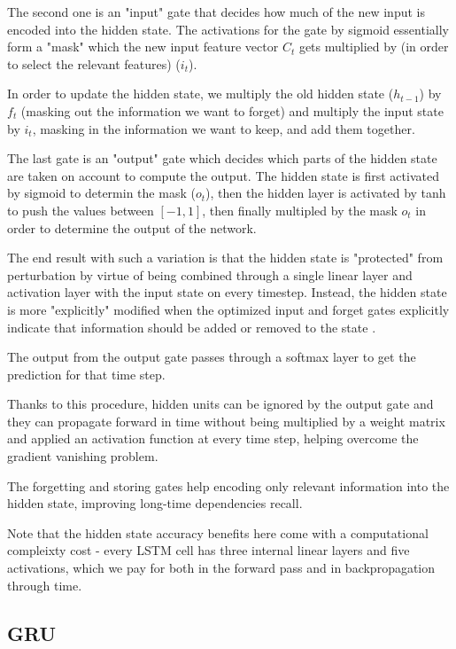 \documentclass[a4paper]{article}
\begin{document}
The second one is an "input" gate that decides how much of the new input is encoded into the hidden state.
The activations for the gate by sigmoid essentially form a "mask" which the new input feature vector
$C_t$ gets multiplied by (in order to select the relevant features) ($i_t$).

In order to update the hidden state, we multiply the old hidden state ($h_{t - 1}$) by $f_t$
(masking out the information we want to forget) and multiply the input state by $i_t$, masking in
the information we want to keep, and add them together.

The last gate is an "output" gate which decides which parts of the hidden state are
taken on account to compute the output. The hidden state is first activated by sigmoid to determin
the mask ($o_t$), then the hidden layer is activated by tanh to push the values between $[-1, 1]$, then
finally multipled by the mask $o_t$ in order to determine the output of the network.

The end result with such a variation is that the hidden state is "protected" from perturbation
by virtue of being combined through a single linear layer and activation layer with the input
state on every timestep. Instead, the hidden state is more "explicitly" modified when the
optimized input and forget gates explicitly indicate that information should be added or removed
to the state \cite{hochreiter97}.

The output from the output gate passes through a softmax layer to get the prediction for that time step.

Thanks to this procedure, hidden units can be ignored by the output gate and
they can propagate forward in time without being multiplied by a weight matrix
and applied an activation function at every time step, helping overcome the
gradient vanishing problem.

The forgetting and storing gates help encoding only relevant information into
the hidden state, improving long-time dependencies recall.

Note that the hidden state accuracy benefits here come with a computational compleixty cost - every
LSTM cell has three internal linear layers and five activations, which we pay for both in the forward
pass and in backpropagation through time.

\subsection{GRU}
\label{sec:gru}
\end{document}

